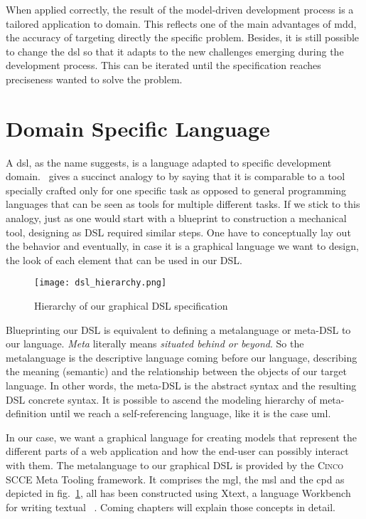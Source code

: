 When applied correctly, the result of the model-driven development process is a tailored application to domain. This reflects one of the main advantages of \acrshort{mdd}, the accuracy of targeting directly the specific problem. Besides, it is still possible to change the \acrshort{dsl} so that it adapts to the new challenges emerging during the development process. This can be iterated until the specification reaches preciseness wanted to solve the problem.

\section{Domain Specific Language}

A \acrfull{dsl}, as the name suggests, is a language adapted to specific development domain.~\cite{Naujokat2018} gives a succinct analogy to  by saying that it is comparable to a tool specially crafted only for one specific task as opposed to general programming languages that can be seen as tools for multiple different tasks. If we stick to this analogy, just as one would start with a blueprint to construction a mechanical tool, designing as DSL required similar steps. One have to conceptually lay out the behavior and eventually, in case it is a graphical language we want to design, the look of each element that can be used in our DSL.

\begin{figure}[H]
    \centering
    \texttt{[image: dsl\_hierarchy.png]}
    \caption{Hierarchy of our graphical DSL specification}
    \label{fig:modeling-hierachy}
\end{figure}

Blueprinting our DSL is equivalent to defining a metalanguage or meta-DSL to our language. \textit{Meta} literally means \textit{situated behind or beyond}. So the metalanguage is the descriptive language coming before our language, describing the meaning (semantic) and the relationship between the objects of our target language. In other words, the meta-DSL is the abstract syntax and the resulting DSL concrete syntax. It is possible to ascend the modeling hierarchy of meta-definition until we reach a self-referencing language, like it is the case \acrfull{uml}.

In our case, we want a graphical language for creating models that represent the different parts of a web application and how the end-user can possibly interact with them. The metalanguage to our graphical DSL is provided by the \textsc{Cinco} SCCE Meta Tooling framework. It comprises the \acrfull{mgl}, the \acrfull{msl} and the \acrfull{cpd} as depicted in fig.~\ref{fig:modeling-hierachy}, all has been constructed using Xtext, a language Workbench for writing textual ~\cite{naujokat-diss}. Coming chapters will explain those concepts in detail.

